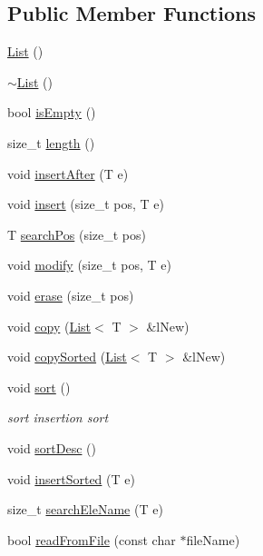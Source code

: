 \subsection*{Public Member Functions}
\begin{DoxyCompactItemize}
\item 
\hyperlink{class_list_a5c5e27671b21b3815d4e25b953c69454}{List} ()
\item 
\hyperlink{class_list_a2b58189090f6e5ce52939c9195e59e85}{$\sim$\+List} ()
\item 
bool \hyperlink{class_list_a73f8b1d313382daffeeeed552f42da2f}{is\+Empty} ()
\item 
size\+\_\+t \hyperlink{class_list_a68cc26f03567b3f2444ca491d0cbcaaf}{length} ()
\item 
void \hyperlink{class_list_a21f3ce01b4ef1a01010e772aff62b021}{insert\+After} (T e)
\item 
void \hyperlink{class_list_a0dd0eaf4e74d73c8c2b4be659f1c833f}{insert} (size\+\_\+t pos, T e)
\item 
T \hyperlink{class_list_a69893c5ca361f9502a0dc1c967612d02}{search\+Pos} (size\+\_\+t pos)
\item 
void \hyperlink{class_list_a0a155d92947a2d58f1476658d22fd4c2}{modify} (size\+\_\+t pos, T e)
\item 
void \hyperlink{class_list_a7b33f41a6fd235d8e4e61e3aa7ffad71}{erase} (size\+\_\+t pos)
\item 
void \hyperlink{class_list_aa5bfaf8ed64d7a3d8a5e748a07457519}{copy} (\hyperlink{class_list}{List}$<$ T $>$ \&l\+New)
\item 
void \hyperlink{class_list_aa283c9dcd29c329105a9b574c04862b1}{copy\+Sorted} (\hyperlink{class_list}{List}$<$ T $>$ \&l\+New)
\item 
void \hyperlink{class_list_adcdf869b2506e2332052eff47afc8412}{sort} ()
\begin{DoxyCompactList}\small\item\em sort insertion sort \end{DoxyCompactList}\item 
void \hyperlink{class_list_a006226544e5e078fdb4207edac1fb154}{sort\+Desc} ()
\item 
void \hyperlink{class_list_aa641ba4a8f1792780ae0dc7cd506aeb6}{insert\+Sorted} (T e)
\item 
size\+\_\+t \hyperlink{class_list_aa614a359e8399195c71d14067484d3b2}{search\+Ele\+Name} (T e)
\item 
bool \hyperlink{class_list_a3777550ab6dc21d161d5ba22424a1ec3}{read\+From\+File} (const char $\ast$file\+Name)

\end{DoxyCompactItemize}

